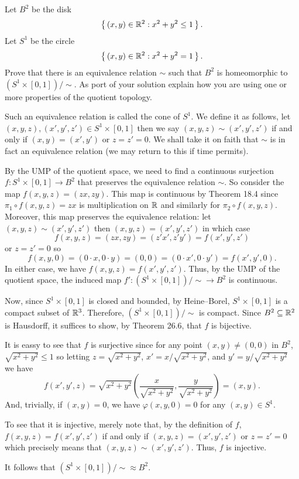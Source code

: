 \begin{problem}
  Let \(B^2\) be the disk
  \[
    \left\{\,(x,y)\in\mathbb{R}^2:x^2+y^2\leq 1\,\right\}.
  \]
  Let \(S^1\) be the circle
  \[
    \left\{\,(x,y)\in\mathbb{R}^2:x^2+y^2=1\,\right\}.
  \]
  Prove that there is an equivalence relation \(\sim\) such that \(B^2\) is
  homeomorphic to \((S^1\times[0,1])/{\sim}\). As port of your solution
  explain how you are using one or more properties of the quotient
  topology.
\end{problem}
\begin{solution}
  Such an equivalence relation is called the cone of \(S^1\). We define it
  as follows, let \((x,y,z),(x',y',z')\in S^1\times[0,1]\) then we say
  \((x,y,z)\sim(x',y',z')\) if and only if \((x,y)=(x',y')\) or
  \(z=z'=0\). We shall take it on faith that \(\sim\) is in fact an
  equivalence relation (we may return to this if time permits).

  By the UMP of the quotient space, we need to find a continuous surjection
  \(f\colon S^1\times[0,1]\to B^2\) that preserves the equivalence relation
  \(\sim\). So consider the map \(f(x,y,z)=(zx,zy)\). This map is
  continuous by Theorem 18.4 since \(\pi_1\circ f(x,y,z)=zx\) is
  multiplication on \(\mathbb{R}\) and similarly for \(\pi_2\circ
  f(x,y,z)\). Moreover, this map preserves the equivalence relation: let
  \((x,y,z)\sim(x',y',z')\) then \((x,y,z)=(x',y',z')\) in which case
  \[
    f(x,y,z)=(zx,zy)=(z'x',z'y')=f(x',y',z')
  \]
  or \(z=z'=0\) so
  \[
    f(x,y,0)=(0\cdot x,0\cdot y)=(0,0)=(0\cdot x',0\cdot y')=f(x',y',0).
  \]
  In either case, we have \(f(x,y,z)=f(x',y',z')\). Thus, by the UMP of the
  quotient space, the induced map
  \(f'\colon (S^1\times[0,1])/{\sim}\to B^2\) is continuous.

  Now, since \(S^1\times[0,1]\) is closed and bounded, by Heine--Borel,
  \(S^1\times[0,1]\) is a compact subset of \(\mathbb{R}^3\). Therefore,
  \((S^1\times[0,1])/{\sim}\) is compact. Since \(B^2\subseteq\mathbb{R}^2\) is
  Hausdorff, it suffices to show, by Theorem 26.6, that \(f\) is bijective.

  It is eassy to see that \(f\) is surjective since for any point
  \((x,y)\neq(0,0)\) in \(B^2\), \(\sqrt{x^2+y^2}\leq 1\) so letting
  \(z=\sqrt{x^2+y^2}\), \(x'=x/\sqrt{x^2+y^2}\), and
  \(y'=y/\sqrt{x^2+y^2}\) we have
  \[
    f(x',y',z)=\sqrt{x^2+y^2} \left(\frac{x}{\sqrt{x^2+y^2}},
      \frac{y}{\sqrt{x^2+y^2}}\right)=(x,y).
  \]
  And, trivially, if \((x,y)=0\), we have \(\varphi(x,y,0)=0\) for any
  \((x,y)\in S^1\).

  To see that it is injective, merely note that, by the definition of
  \(f\), \(f(x,y,z)=f(x',y',z')\) if and only if \((x,y,z)=(x',y',z')\) or
  \(z=z'=0\) which precisely means that \((x,y,z)\sim(x',y',z')\). Thus,
  \(f\) is injective.

  It follows that \((S^1\times[0,1])/{\sim}\approx B^2\).
\end{solution}

